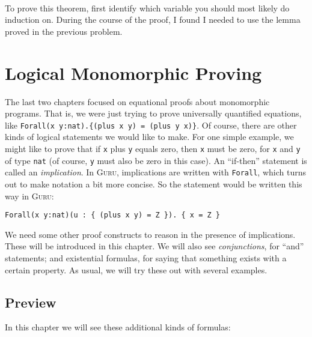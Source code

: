 \documentclass{book}[12pt]
\newcommand{\guru}[0]{\textsc{Guru}\xspace}
\begin{document}
\begin{enumerate}
\ 

To prove this theorem, first identify which variable you should
most likely do induction on.  During the course of the proof, I found
I needed to use the lemma proved in the previous problem.

\end{enumerate}

\chapter{Logical Monomorphic Proving}
\label{ch5}

The last two chapters focused on equational proofs about monomorphic
programs.  That is, we were just trying to prove universally
quantified equations, like \texttt{Forall(x y:nat).\{(plus x y) =
(plus y x)\}}.  Of course, there are other kinds of logical statements
we would like to make.  For one simple example, we might like to prove
that if \texttt{x} plus \texttt{y} equals zero, then \texttt{x} must
be zero, for \texttt{x} and \texttt{y} of type \texttt{nat} (of
course, \texttt{y} must also be zero in this case).  An ``if-then''
statement is called an \emph{implication}.  In \guru, implications are
written with \texttt{Forall}, which turns out to make notation a bit
more concise.  So the statement would be written this way in \guru:

\begin{verbatim}
Forall(x y:nat)(u : { (plus x y) = Z }). { x = Z }
\end{verbatim}

\noindent We need some other proof constructs to reason in the
presence of implications.  These will be introduced in this chapter.
We will also see \emph{conjunctions}, for ``and'' statements; and
existential formulas, for saying that something exists with a certain
property.  As usual, we will try these out with several examples.

\section{Preview}

In this chapter we will see these additional kinds of formulas:
\end{document}
